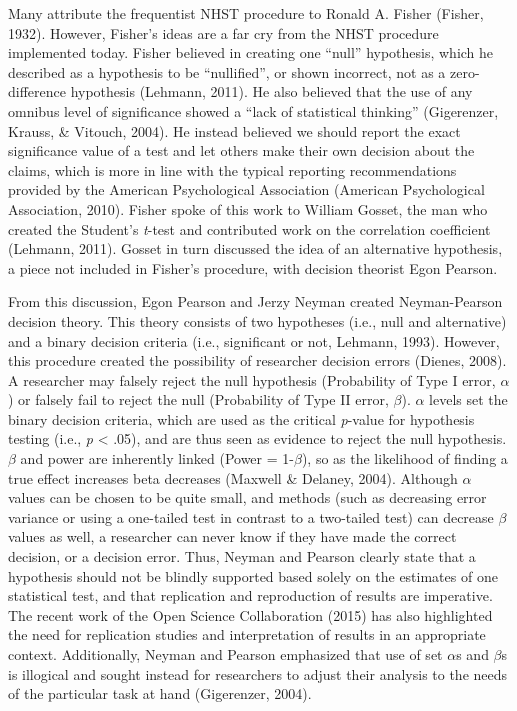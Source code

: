 \documentclass[,man, mask]{apa6}
\theoremstyle{definition}
\theoremstyle{definition}
\theoremstyle{definition}
\theoremstyle{remark}
\begin{document}
Many attribute the frequentist NHST procedure to Ronald A. Fisher
(Fisher, 1932). However, Fisher's ideas are a far cry from the NHST
procedure implemented today. Fisher believed in creating one
\enquote{null} hypothesis, which he described as a hypothesis to be
\enquote{nullified}, or shown incorrect, not as a zero-difference
hypothesis (Lehmann, 2011). He also believed that the use of any omnibus
level of significance showed a \enquote{lack of statistical thinking}
(Gigerenzer, Krauss, \& Vitouch, 2004). He instead believed we should
report the exact significance value of a test and let others make their
own decision about the claims, which is more in line with the typical
reporting recommendations provided by the American Psychological
Association (American Psychological Association, 2010). Fisher spoke of
this work to William Gosset, the man who created the Student's
\emph{t}-test and contributed work on the correlation coefficient
(Lehmann, 2011). Gosset in turn discussed the idea of an alternative
hypothesis, a piece not included in Fisher's procedure, with decision
theorist Egon Pearson.

From this discussion, Egon Pearson and Jerzy Neyman created
Neyman-Pearson decision theory. This theory consists of two hypotheses
(i.e., null and alternative) and a binary decision criteria (i.e.,
significant or not, Lehmann, 1993). However, this procedure created the
possibility of researcher decision errors (Dienes, 2008). A researcher
may falsely reject the null hypothesis (Probability of Type I error,
\(\alpha\)) or falsely fail to reject the null (Probability of Type II
error, \(\beta\)). \(\alpha\) levels set the binary decision criteria,
which are used as the critical \emph{p}-value for hypothesis testing
(i.e., \emph{p} \textless{} .05), and are thus seen as evidence to
reject the null hypothesis. \(\beta\) and power are inherently linked
(Power = 1-\(\beta\)), so as the likelihood of finding a true effect
increases beta decreases (Maxwell \& Delaney, 2004). Although \(\alpha\)
values can be chosen to be quite small, and methods (such as decreasing
error variance or using a one-tailed test in contrast to a two-tailed
test) can decrease \(\beta\) values as well, a researcher can never know
if they have made the correct decision, or a decision error. Thus,
Neyman and Pearson clearly state that a hypothesis should not be blindly
supported based solely on the estimates of one statistical test, and
that replication and reproduction of results are imperative. The recent
work of the Open Science Collaboration (2015) has also highlighted the
need for replication studies and interpretation of results in an
appropriate context. Additionally, Neyman and Pearson emphasized that
use of set \(\alpha\)s and \(\beta\)s is illogical and sought instead
for researchers to adjust their analysis to the needs of the particular
task at hand (Gigerenzer, 2004).
\end{document}
